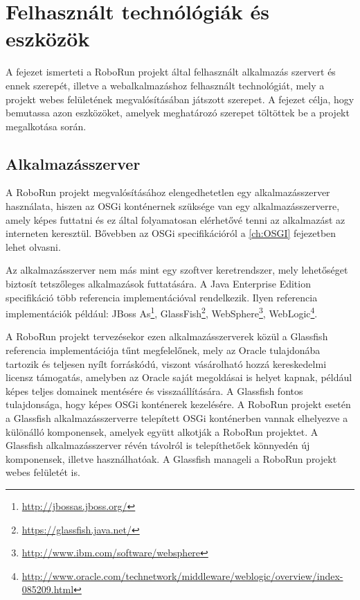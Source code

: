 \chapter{Felhasznált technólógiák és eszközök}\label{ch:TechnologiakEsEszkozok}

\begin{osszefoglal}
	A fejezet ismerteti a RoboRun projekt által felhasznált alkalmazás szervert és ennek szerepét, illetve a webalkalmazáshoz felhasznált technológiát, mely a projekt webes felületének megvalósításában játszott szerepet. A fejezet célja, hogy bemutassa azon eszközöket, amelyek meghatározó szerepet töltöttek be a projekt megalkotása során.
\end{osszefoglal}


\section{Alkalmazásszerver}\label{sec:Glassfish}
	
	A RoboRun projekt megvalósításához elengedhetetlen egy alkalmazásszerver használata, hiszen az OSGi konténernek szüksége van egy alkalmazásszerverre, amely képes futtatni és ez által folyamatosan elérhetővé tenni az alkalmazást az interneten keresztül. Bővebben az OSGi specifikációról a \ref{ch:OSGI} fejezetben lehet olvasni.
	
	 Az alkalmazásszerver nem más mint egy szoftver keretrendszer, mely lehetőséget biztosít tetszőleges alkalmazások futtatására. A Java Enterprise Edition specifikáció több referencia implementációval rendelkezik. Ilyen referencia implementációk például: JBoss As\footnote{\href {http://jbossas.jboss.org/}{http://jbossas.jboss.org/}}, GlassFish\footnote{\href {https://glassfish.java.net/}{https://glassfish.java.net/}}, WebSphere\footnote{\href {http://www.ibm.com/software/websphere}{http://www.ibm.com/software/websphere}}, WebLogic\footnote{\href {http://www.oracle.com/technetwork/middleware/weblogic/overview/index-085209.html}{http://www.oracle.com/technetwork/middleware/weblogic/overview/index-085209.html}}.
	
	A RoboRun projekt tervezésekor ezen alkalmazásszerverek közül a Glassfish referencia implementációja tűnt megfelelőnek, mely az Oracle tulajdonába tartozik és teljesen nyílt forráskódú, viszont vásárolható hozzá kereskedelmi licensz támogatás, amelyben az Oracle saját megoldásai is helyet kapnak, például képes teljes domainek mentésére és visszaállítására. A Glassfish fontos tulajdonsága, hogy képes OSGi konténerek kezelésére. A RoboRun projekt esetén a Glassfish alkalmazásszerverre telepített OSGi konténerben vannak elhelyezve a különálló komponensek, amelyek együtt alkotják a RoboRun projektet. A Glassfish alkalmazásszerver révén távolról is telepíthetőek könnyedén új komponensek, illetve használhatóak. A Glassfish manageli a RoboRun projekt webes felületét is.

